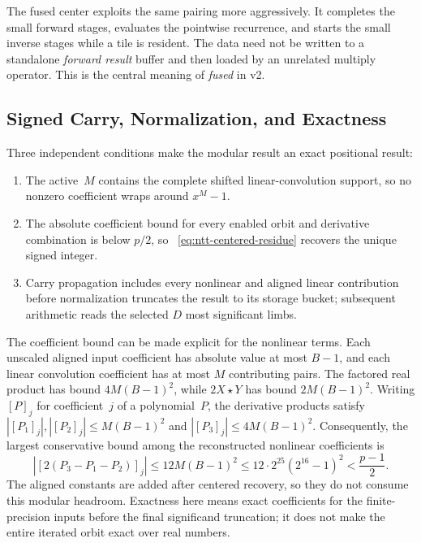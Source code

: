 The fused center exploits the same pairing more aggressively.  It completes
the small forward stages, evaluates the pointwise recurrence, and starts the
small inverse stages while a tile is resident.  The data need not be written to
a standalone \emph{forward result} buffer and then loaded by an unrelated
multiply operator.  This is the central meaning of \emph{fused} in v2.

\subsection{Signed Carry, Normalization, and Exactness}
\label{subsec:fused-ntt-carry}
\label{sec:hp-add}

Three independent conditions make the modular result an exact positional
result:

\begin{enumerate}
  \item The active~$M$ contains the complete shifted linear-convolution support,
        so no nonzero coefficient wraps around $x^M-1$.
  \item The absolute coefficient bound for every enabled orbit and derivative
        combination is below $p/2$, so
        ~\eqref{eq:ntt-centered-residue} recovers the unique signed integer.
  \item Carry propagation includes every nonlinear and aligned linear
        contribution before normalization truncates the result to its storage
        bucket; subsequent arithmetic reads the selected $D$ most significant limbs.
\end{enumerate}

The coefficient bound can be made explicit for the nonlinear terms.  Each
unscaled aligned input coefficient has absolute value at most $B-1$, and each
linear convolution coefficient has at most $M$ contributing pairs.  The factored real
product has bound $4M(B-1)^2$, while $2X\star Y$ has bound $2M(B-1)^2$.
Writing $[P]_j$ for coefficient~$j$ of a polynomial~$P$, the derivative products
satisfy $|[P_1]_j|,|[P_2]_j|\le M(B-1)^2$ and
$|[P_3]_j|\le 4M(B-1)^2$.  Consequently, the largest
conservative bound among the reconstructed nonlinear coefficients is
\begin{equation}
  |[2(P_3-P_1-P_2)]_j|
  \le 12M(B-1)^2
  \le 12\cdot 2^{25}(2^{16}-1)^2
  < \frac{p-1}{2}.
  \label{eq:reference-centered-headroom}
\end{equation}
The aligned constants are added after centered recovery, so they do not
consume this modular headroom.  Exactness here means exact coefficients for
the finite-precision inputs before the final significand truncation; it does
not make the entire iterated orbit exact over real numbers.

